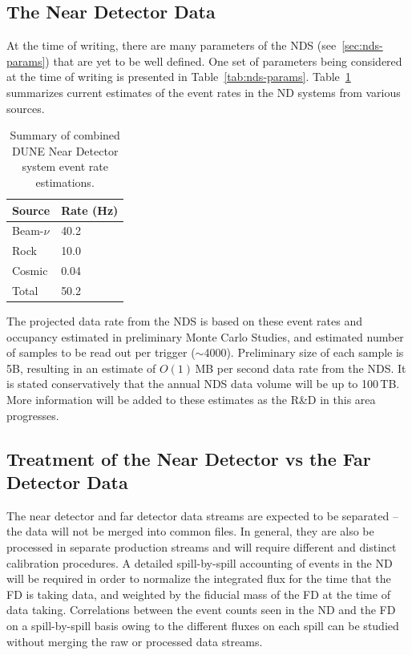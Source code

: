 \subsection{The Near Detector Data}
\label{sec:nds-event-rates}
At the time of writing, there are many parameters of the NDS (see~\ref{sec:nds-params})
that are yet to be well defined. One set of parameters being considered at the time of writing is presented in
Table~\ref{tab:nds-params}. Table~\ref{tab:nds-event-rates} summarizes current estimates of the event rates
in the ND systems from various sources.

\begin{table}[ht!]
\centering
\begin{tabular}{| p{0.8in} | p{0.8in} |}		\hline		
\textbf{Source} & \textbf{Rate} (Hz)\\ \hline
Beam-$\nu$ & 40.2 \\ \hline
Rock & 10.0 \\ \hline
Cosmic & 0.04 \\ \hline
Total & 50.2 \\ \hline
\end{tabular}
\caption{Summary of combined DUNE Near Detector system event rate estimations.}
\label{tab:nds-event-rates}
\end{table}

\noindent
The projected data rate from the NDS is based on these event rates and occupancy estimated in preliminary Monte Carlo Studies,
and estimated number of samples to be read out per trigger ($\sim$4000). Preliminary size of each sample is 5B, resulting in an estimate
of $O(1)$\,MB per second data rate from the NDS. It is stated conservatively that the annual NDS data volume will be up to 100\,TB.
More information will be added to these estimates as the R\&D in this area progresses.

\subsection{Treatment of the Near Detector vs the Far Detector Data}
\label{sec:near-vs-far-data}
The near detector and far detector data streams are expected to be separated -- the data will not be merged into common files.
In general, they are also be processed in separate production streams and will require different and
distinct calibration procedures.  A detailed spill-by-spill accounting of events in the ND will be required in order to
normalize the integrated flux for the time that the FD is taking data, and weighted by the fiducial mass of the FD at the
time of data taking.  Correlations between the event counts seen in
the ND and the FD on a spill-by-spill basis owing to the different fluxes on each spill can be studied without merging the
raw or processed data streams.

